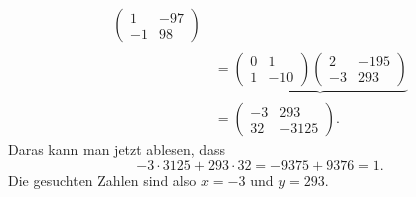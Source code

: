\begin{loesung}
\begin{align*}
{\begin{pmatrix}
1&-97\\-1&98
\end{pmatrix}
}_{}
\\
&=
\underbrace{
\begin{pmatrix}
0&1\\1&-10
\end{pmatrix}
\begin{pmatrix}
2&-195\\-3&293
\end{pmatrix}
}_{}
\\
&=
\begin{pmatrix}
-3&293\\32&-3125
\end{pmatrix}.
\end{align*}
Daras kann man jetzt ablesen, dass
\[
-3\cdot 3125
+ 
293\cdot 32
=
-9375
+
9376
=
1.
\]
Die gesuchten Zahlen sind also $x=-3$ und $y=293$.
\end{loesung}

